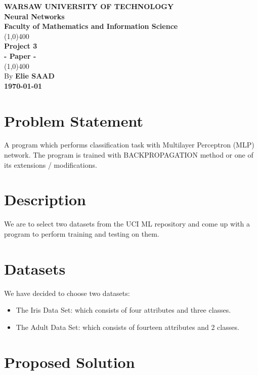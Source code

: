 \documentclass[11pt]{article}
\theoremstyle{definition}
\begin{document}
\begin{titlepage}
\begin{center}
\vspace*{1cm}
\Large{\textbf{\MakeUppercase{Warsaw University of Technology}}}\\[3mm]
\huge{\textbf{Neural Networks}}\\[3mm]
\Large{\textbf{Faculty of Mathematics and Information Science}}\\
\vfill
\line(1,0){400}\\[1mm]
\huge{\textbf{Project 3}}\\[3mm]
\Large{\textbf{- Paper -}}\\[1mm]
\line(1,0){400}\\
\vfill
By \textbf{Elie SAAD}\\
\Large{\textbf{\today}}\\
\end{center}
\end{titlepage}

\tableofcontents
\thispagestyle{empty}
\clearpage

\section{Problem Statement}
A program which performs classification task with Multilayer Perceptron (MLP) network. The
program is trained with BACKPROPAGATION method or one of its extensions / modifications.

\section{Description}
We are to select two datasets from the UCI ML repository and come up with a program to perform training and testing on them.

\section{Datasets}
We have decided to choose two datasets:
\begin{itemize}
\item The Iris Data Set: which consists of four attributes and three classes.
\item The Adult Data Set: which consists of fourteen attributes and 2 classes.
\end{itemize}

\section{Proposed Solution}
\end{document}
